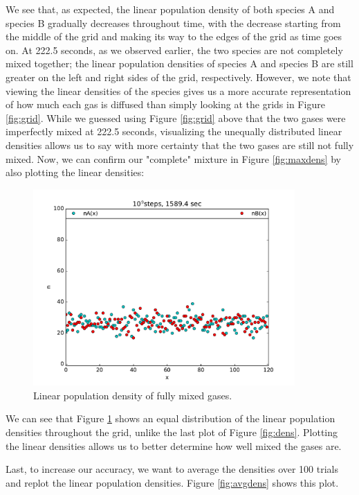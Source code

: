 \documentclass{article}
\begin{document}
\noindent We see that, as expected, the linear population density of both species A and species B gradually decreases throughout time, with the decrease starting from the middle of the grid and making its way to the edges of the grid as time goes on. At 222.5 seconds, as we observed earlier, the two species are not completely mixed together; the linear population densities of species A and species B are still greater on the left and right sides of the grid, respectively. However, we note that viewing the linear densities of the species gives us a more accurate representation of how much each gas is diffused than simply looking at the grids in Figure \ref{fig:grid}. While we guessed using Figure \ref{fig:grid} above that the two gases were imperfectly mixed at 222.5 seconds, visualizing the unequally distributed linear densities allows us to say with more certainty that the two gases are still not fully mixed. Now, we can confirm our "complete" mixture in Figure \ref{fig:maxdens} by also plotting the linear densities:\par

\begin{figure}[H]
\centering
\includegraphics[width=10cm]{GP1_3_maxlimit_density.pdf}
\caption{Linear population density of fully mixed gases.}
\label{fig:maxdensplot}
\end{figure}

\noindent We can see that Figure \ref{fig:maxdensplot} shows an equal distribution of the linear population densities throughout the grid, unlike the last plot of Figure \ref{fig:dens}. Plotting the linear densities allows us to better determine how well mixed the gases are.\par

Last, to increase our accuracy, we want to average the densities over 100 trials and replot the linear population densities. Figure \ref{fig:avgdens} shows this plot.\par
\end{document}
